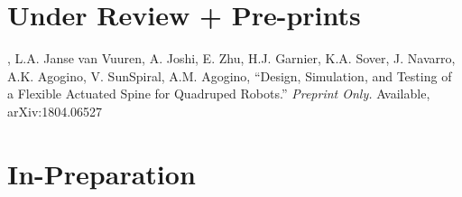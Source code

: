 \documentclass[letterpaper]{deedy-resume} %
\begin{document}
{%



  




\section{Under Review + Pre-prints}

\vspace{0.2cm}

\begin{etaremune}[itemsep=0.1cm]

\item \underline{{}}, L.A. Janse van Vuuren, A. Joshi, E. Zhu, H.J. Garnier, K.A. Sover, J. Navarro, A.K. Agogino, V. SunSpiral, A.M. Agogino, ``Design, Simulation, and Testing of a Flexible Actuated Spine for Quadruped Robots.'' {\it Preprint Only.} Available, arXiv:1804.06527 

\end{etaremune}  

  
\section{In-Preparation}

}
\end{document}
